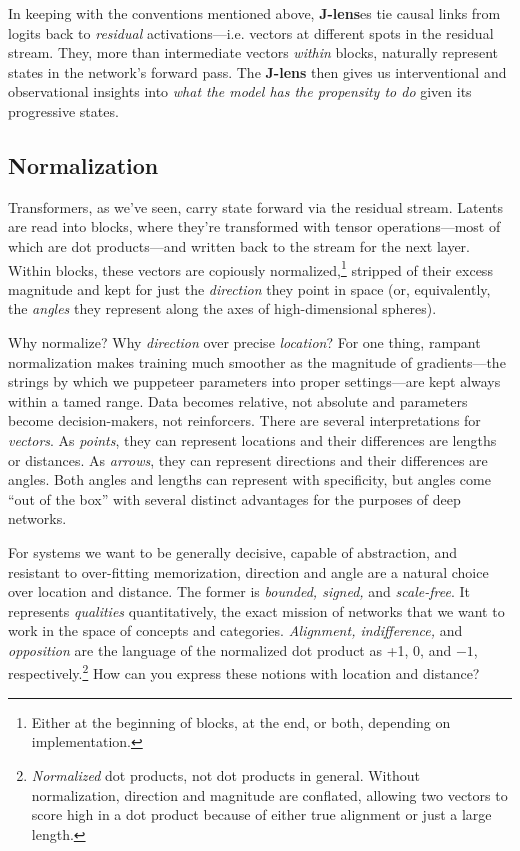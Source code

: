 \documentclass{article}
\begin{document}
In keeping with the conventions mentioned above, \textbf{J-lens}es tie causal links from logits back to \textit{residual} activations---i.e. vectors at different spots in the residual stream. They, more than intermediate vectors \textit{within} blocks, naturally represent states in the network's forward pass. The \textbf{J-lens} then gives us interventional and observational insights into \textit{what the model has the propensity to do} given its progressive states.


\subsection{Normalization}

Transformers, as we've seen, carry state forward via the residual stream. Latents are read into blocks, where they're transformed with tensor operations---most of which are dot products---and written back to the stream for the next layer. Within blocks, these vectors are copiously normalized,\footnote{Either at the beginning of blocks, at the end, or both, depending on implementation.} stripped of their excess magnitude and kept for just the \textit{direction} they point in space (or, equivalently, the \textit{angles} they represent along the axes of high-dimensional spheres). 

Why normalize? Why \textit{direction} over precise \textit{location}? For one thing, rampant normalization makes training much smoother as the magnitude of gradients---the strings by which we puppeteer parameters into proper settings---are kept always within a tamed range. Data becomes relative, not absolute and parameters become decision-makers, not reinforcers. There are several interpretations for \textit{vectors}. As \textit{points}, they can represent locations and their differences are lengths or distances. As \textit{arrows}, they can represent directions and their differences are angles. Both angles and lengths can represent with specificity, but angles come ``out of the box'' with several distinct advantages for the purposes of deep networks. 

For systems we want to be generally decisive, capable of abstraction, and resistant to over-fitting memorization, direction and angle are a natural choice over location and distance. The former is \textit{bounded, signed, }and\textit{ scale-free}. It represents \textit{qualities} quantitatively, the exact mission of networks that we want to work in the space of concepts and categories. \textit{Alignment, indifference, }and\textit{ opposition} are the language of the normalized dot product as +1, 0, and $-1$, respectively.\footnote{\textit{Normalized} dot products, not dot products in general. Without normalization, direction and magnitude are conflated, allowing two vectors to score high in a dot product because of either true alignment or just a large length.} How can you express these notions with location and distance? 
\end{document}
